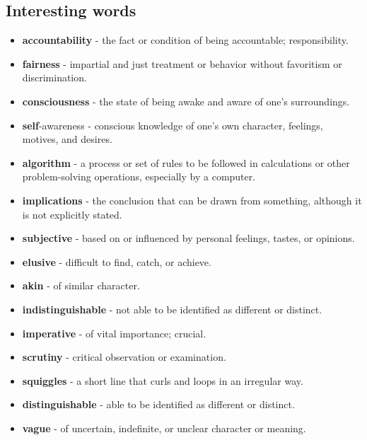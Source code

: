 \documentclass[12pt]{extarticle}
\begin{document}
\subsection*{Interesting words}
\begin{itemize}
    \item \textbf{accountability} - the fact or condition of being accountable; responsibility.
    \item \textbf{fairness} - impartial and just treatment or behavior without favoritism or discrimination.
    \item \textbf{consciousness} - the state of being awake and aware of one's surroundings.
    \item \textbf{self}-awareness - conscious knowledge of one's own character, feelings, motives, and desires.
    \item \textbf{algorithm} - a process or set of rules to be followed in calculations or other problem-solving operations, especially by a computer.
    \item \textbf{implications} - the conclusion that can be drawn from something, although it is not explicitly stated.
    \item \textbf{subjective} - based on or influenced by personal feelings, tastes, or opinions.
    \item \textbf{elusive} - difficult to find, catch, or achieve.
    \item \textbf{akin} - of similar character.
    \item \textbf{indistinguishable} - not able to be identified as different or distinct.
    \item \textbf{imperative} - of vital importance; crucial.
    \item \textbf{scrutiny} - critical observation or examination.
    \item \textbf{squiggles} - a short line that curls and loops in an irregular way.
    \item \textbf{distinguishable} - able to be identified as different or distinct.
    \item \textbf{vague} - of uncertain, indefinite, or unclear character or meaning.
\end{itemize}
\end{document}
